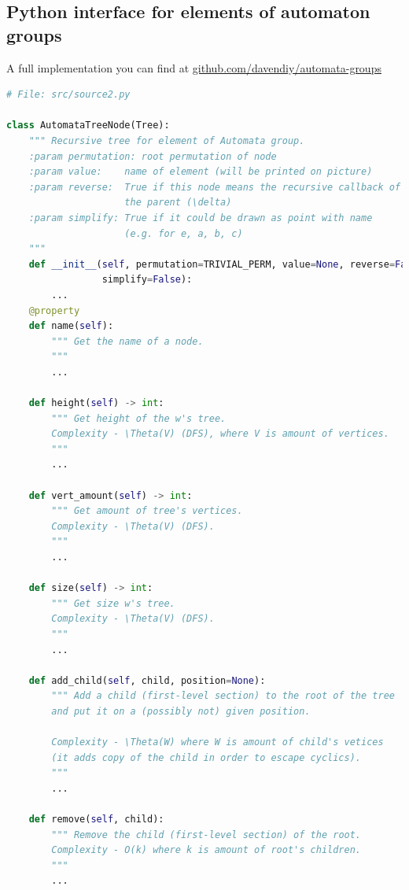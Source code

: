 \documentclass[a4paper,12pt]{amsart}
\begin{document}
\begin{appendices}

\section{Python interface for elements of automaton groups}

A full implementation you can find at \href{https://github.com/davendiy/automata-groups}{github.com/davendiy/automata-groups}

\begin{lstlisting}[language=Python, basicstyle=\tiny]
# File: src/source2.py

class AutomataTreeNode(Tree):
    """ Recursive tree for element of Automata group.
    :param permutation: root permutation of node
    :param value:    name of element (will be printed on picture)
    :param reverse:  True if this node means the recursive callback of
                     the parent (\delta)
    :param simplify: True if it could be drawn as point with name
                     (e.g. for e, a, b, c)
    """
    def __init__(self, permutation=TRIVIAL_PERM, value=None, reverse=False,
                 simplify=False):
        ...
    @property
    def name(self):
        """ Get the name of a node.
        """
        ...

    def height(self) -> int:
        """ Get height of the w's tree.
        Complexity - \Theta(V) (DFS), where V is amount of vertices.
        """
        ...

    def vert_amount(self) -> int:
        """ Get amount of tree's vertices.
        Complexity - \Theta(V) (DFS).
        """
        ...

    def size(self) -> int:
        """ Get size w's tree.
        Complexity - \Theta(V) (DFS).
        """
        ...

    def add_child(self, child, position=None):
        """ Add a child (first-level section) to the root of the tree
        and put it on a (possibly not) given position.

        Complexity - \Theta(W) where W is amount of child's vetices
        (it adds copy of the child in order to escape cyclics).
        """
        ...

    def remove(self, child):
        """ Remove the child (first-level section) of the root.
        Complexity - O(k) where k is amount of root's children.
        """
        ...

\end{lstlisting}


\end{appendices}
\end{document}
